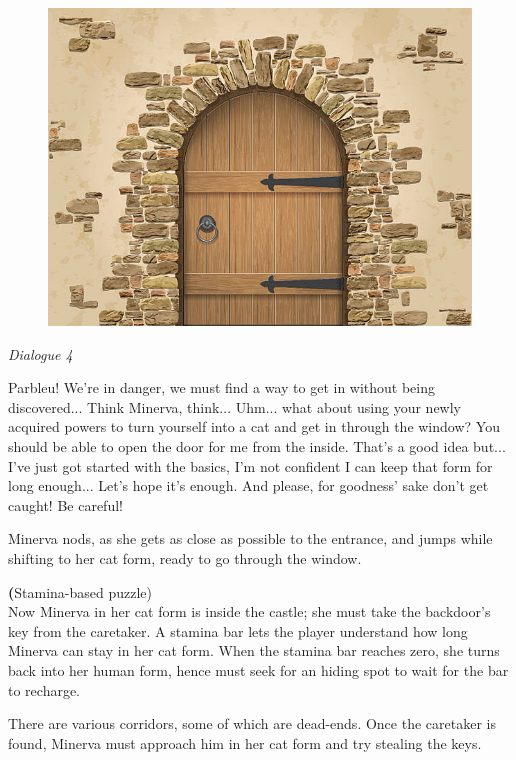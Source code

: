 \begin{figure}[H]
\includegraphics[max width=\textwidth]{../Pictures/Level/Script/Door_closed_picture.png}
\end{figure} 

\textit{Dialogue 4} 
\begin{dialogue}
 Parbleu! We're in danger, we must find a way to get in without being discovered... Think Minerva, think...
 Uhm... what about using your newly acquired powers to turn yourself into a cat and get in through the window? You should be able to open the door for me from the inside.
  That's a good idea but... I've just got started with the basics, I'm not confident I can keep that form for long enough...
  Let's hope it's enough. And please, for goodness' sake don't get caught! Be careful!
\end{dialogue}

Minerva nods, as she gets as close as possible to the entrance, and jumps while shifting to her cat form, ready to go through the window.

\textbf(Stamina-based puzzle) \\ 

Now Minerva in her cat form is inside the castle; she must take the backdoor's key from the caretaker. A stamina bar lets the player understand how long Minerva can stay in her cat form. When the stamina bar reaches zero, she turns back into her human form, hence must seek for an hiding spot to wait for the bar to recharge.

There are various corridors, some of which are dead-ends. Once the caretaker is found, Minerva must approach him in her cat form and try stealing the keys.

